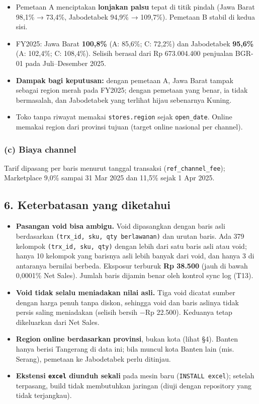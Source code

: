 \documentclass[10pt,a4paper]{article}
\providecommand{\tightlist}{\setlength{\itemsep}{1pt}\setlength{\parskip}{0pt}}
\begin{document}
\begin{itemize}
\tightlist
\item
  Pemetaan A menciptakan \textbf{lonjakan palsu} tepat di titik pindah (Jawa Barat 98,1\% → 73,4\%, Jabodetabek 94,9\% → 109,7\%). Pemetaan B stabil di kedua sisi.
\item
  FY2025: Jawa Barat \textbf{100,8\%} (A: 85,6\%; C: 72,2\%) dan Jabodetabek \textbf{95,6\%} (A: 102,4\%; C: 108,4\%). Selisih berasal dari Rp 673.004.400 penjualan BGR-01 pada Juli--Desember 2025.
\item
  \textbf{Dampak bagi keputusan:} dengan pemetaan A, Jawa Barat tampak sebagai region merah pada FY2025; dengan pemetaan yang benar, ia tidak bermasalah, dan Jabodetabek yang terlihat hijau sebenarnya Kuning.
\item
  Toko tanpa riwayat memakai \texttt{stores.region} sejak \texttt{open\_\allowbreak{}date}. Online memakai region dari provinsi tujuan (target online nasional per channel).
\end{itemize}

\subsubsection{(c) Biaya channel}\label{c-biaya-channel}

Tarif dipasang per baris menurut tanggal transaksi (\texttt{ref\_\allowbreak{}channel\_\allowbreak{}fee}); Marketplace 9,0\% sampai 31 Mar 2025 dan 11,5\% sejak 1 Apr 2025.

\subsection{6. Keterbatasan yang diketahui}\label{keterbatasan-yang-diketahui}

\begin{itemize}
\tightlist
\item
  \textbf{Pasangan void bisa ambigu.} Void dipasangkan dengan baris asli berdasarkan \texttt{(trx\_\allowbreak{}id,\ sku,\ qty\ berlawanan)} dan urutan baris. Ada 379 kelompok \texttt{(trx\_\allowbreak{}id,\ sku,\ qty)} dengan lebih dari satu baris asli atau void; hanya 10 kelompok yang barisnya asli lebih banyak dari void, dan hanya 3 di antaranya bernilai berbeda. Eksposur terburuk \textbf{Rp 38.500} (jauh di bawah 0,0001\% Net Sales). Jumlah baris dijamin benar oleh kontrol sync log (T13).
\item
  \textbf{Void tidak selalu meniadakan nilai asli.} Tiga void dicatat sumber dengan harga penuh tanpa diskon, sehingga void dan baris aslinya tidak persis saling meniadakan (selisih bersih −Rp 22.500). Keduanya tetap dikeluarkan dari Net Sales.
\item
  \textbf{Region online berdasarkan provinsi}, bukan kota (lihat §4). Banten hanya berisi Tangerang di data ini; bila muncul kota Banten lain (mis. Serang), pemetaan ke Jabodetabek perlu ditinjau.
\item
  \textbf{Ekstensi \texttt{excel} diunduh sekali} pada mesin baru (\texttt{INSTALL\ excel}); setelah terpasang, build tidak membutuhkan jaringan (diuji dengan repository yang tidak terjangkau).
\end{itemize}
\end{document}
